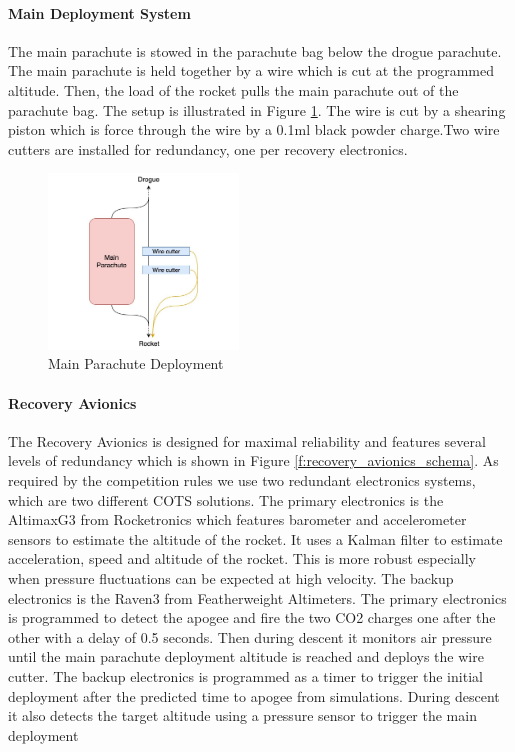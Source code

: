 \paragraph{Main Deployment System}
\hfill \break
The main parachute is stowed in the parachute bag below the drogue parachute. The main parachute is held together by a wire which is cut at the programmed altitude. Then, the load of the rocket pulls the main parachute out of the parachute bag. The setup is illustrated in Figure \ref{f:recovery_main_deployment}. The wire is cut by a shearing piston which is force through the wire by a 0.1ml black powder charge.Two wire cutters are installed for redundancy, one per recovery electronics.

\begin{figure}[h!]
 	\centering
        \includegraphics[width=0.45\textwidth]{img/recovery_main_deployment.jpg}
        \caption{Main Parachute Deployment}
        \label{f:recovery_main_deployment}
 \end{figure}

 \paragraph{Recovery Avionics}
 \hfill \break
The Recovery Avionics is designed for maximal reliability and features several levels of redundancy which is shown in Figure \ref{f:recovery_avionics_schema}. As required by the competition rules we use two redundant electronics systems, which are two different COTS solutions.
The primary electronics is the AltimaxG3 from Rocketronics which features barometer and accelerometer sensors to estimate the altitude of the rocket. It uses a Kalman filter to estimate acceleration, speed and altitude of the rocket. This is more robust especially when pressure fluctuations can be expected at high velocity.
The backup electronics is the Raven3 from Featherweight Altimeters.
The primary electronics is programmed to detect the apogee and fire the two CO2 charges one after the other with a delay of 0.5 seconds. Then during descent it monitors air pressure until the main parachute deployment altitude is reached and deploys the wire cutter.
The backup electronics is programmed as a timer to trigger the initial deployment after the predicted time to apogee from simulations. During descent it also detects the target altitude using a pressure sensor to trigger the main deployment
 
